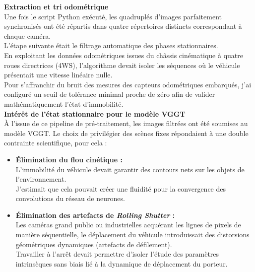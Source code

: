 \documentclass[12pt,a4paper,oneside]{report}
\begin{document}
\par\bigskip
\par\bigskip

\hspace*{0.4cm}\textbf{Extraction et tri odométrique }\\

\hspace*{.3cm}Une fois le script Python exécuté, les quadruplés d'images parfaitement synchronisés ont été répartis dans quatre répertoires distincts correspondant à chaque caméra.\\
\hspace*{.3cm}L'étape suivante était le filtrage automatique des phases stationnaires.\\
\hspace*{.3cm} En exploitant les données odométriques issues du châssis cinématique à quatre roues directrices (4WS), l'algorithme devait isoler les séquences où le véhicule présentait une vitesse linéaire nulle.\\
 \hspace*{.3cm} Pour s'affranchir du bruit des mesures des capteurs odométriques embarqués, j'ai configuré un seuil de tolérance minimal proche de zéro afin de valider mathématiquement l'état d'immobilité.\\

\newpage
\hspace*{0.4cm}\textbf{Intérêt de l'état stationnaire pour le modèle VGGT}\\

\hspace*{.3cm}À l'issue de ce pipeline de pré-traitement, les images filtrées ont été soumises au modèle VGGT. Le choix de privilégier des scènes fixes répondaient à une double contrainte scientifique, pour cela :
\begin{itemize}
    \item \textbf{Élimination du flou cinétique :}\\
 L'immobilité du véhicule devait garantir des contours nets sur les objets de l'environnement.\\
 J'estimait que cela pouvait créer une fluidité pour la convergence des convolutions du réseau de neurones.
    \item \textbf{Élimination des artefacts de \textit{Rolling Shutter} :} \\
Les caméras grand public ou industrielles acquérant les lignes de pixels de manière séquentielle, le déplacement du véhicule introduissait des distorsions géométriques dynamiques (artefacts de défilement).\\
 Travailler à l'arrêt devait permettre d'isoler l'étude des paramètres intrinsèques sans biais lié à la dynamique de déplacement du porteur.
\end{itemize}
\end{document}
